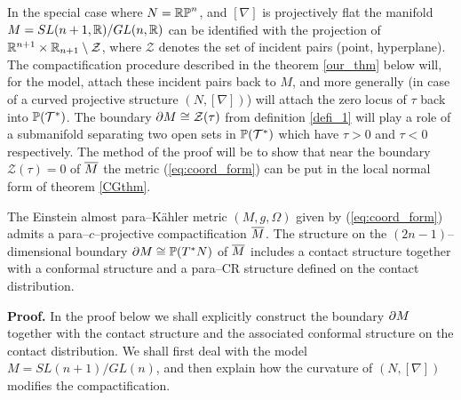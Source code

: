 In the special case where $N=\mathbb{RP}^n$, and $[\nabla]$ is projectively flat the manifold $M=SL(n+1, \mathbb{R})/GL(n, \mathbb{R})$ can be identified with the projection of $\mathbb{R}^{n+1}\times \mathbb{R}_{n+1}\setminus {\mathcal Z}$, where ${\mathcal Z}$ denotes the set of incident pairs (point, hyperplane).
 The compactification procedure described in  
the theorem \ref{our_thm} below will, for the model, attach these incident pairs back to $M$, and more generally (in case of a curved projective structure $(N,[\nabla])$) will attach the zero locus of $\tau$ back into $\mathbb{P}(\mathcal{T}^*)$. The boundary $\partial M \cong \mathcal{Z}(\tau)$ from definition \ref{defi_1} will play a role of a submanifold
separating two open sets in $\mathbb{P}(\mathcal{T}^*)$ which have $\tau>0$ and $\tau<0$ respectively. The method of the proof will be to show that near
the boundary ${\mathcal{Z}}(\tau)=0$ of $\overline{M}$ the metric 
(\ref{eq:coord_form}) can be put in the local normal form of theorem 
\ref{CGthm}.




\begin{theo}
\label{our_thm}
The Einstein almost para--K\"ahler metric $(M, g, \Omega)$ given by 
(\ref{eq:coord_form}) admits a para--$c$--projective compactification
$\overline{M}$. The structure on the
$(2n-1)$--dimensional boundary $\partial M\cong \mathbb{P}(T^* N)$ of $\overline{M}$ includes a contact structure together with a conformal structure 
and a para--CR structure
defined on the contact distribution.
\end{theo}
\noindent
{\bf Proof.}
In the proof below we shall explicitly construct the boundary $\partial M$ together with the contact structure and the associated conformal structure on the contact distribution. We shall
first deal with the model $M=SL(n+1)/GL(n)$, and then explain how the curvature
of $(N, [\nabla])$ modifies the compactification.

